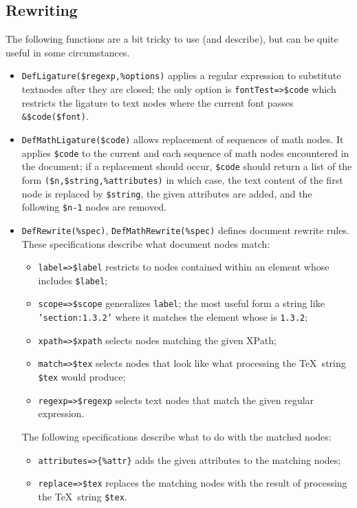 \documentclass{book}
\newcommand{\ltxcode}{\lstinline[style=latexml]}
\begin{document}
\subsection{Rewriting}\label{customization.latexml.rewriting}
The following functions are a bit tricky to use (and describe),
but can be quite useful in some circumstances.
\begin{itemize}
\item \ltxcode|DefLigature($regexp,%
to substitute textnodes after they are closed; the only option is \ltxcode|fontTest=>$code|
which restricts the ligature to text nodes where the current font passes \ltxcode|&$code($font)|.
\item \ltxcode|DefMathLigature($code)| allows replacement of sequences of math nodes.
It applies \ltxcode|$code| to the current 
and each sequence of math nodes encountered in the document; if a replacement should
occur, \ltxcode|$code| should return a list of the form \ltxcode|($n,$string,%
in which case, the text content of the first node is replaced by \ltxcode|$string|,
the given attributes are added, and the following \ltxcode|$n-1| nodes are removed.
\item \ltxcode|DefRewrite(%
rewrite rules. These specifications describe what document nodes match:
\begin{itemize}
\item \ltxcode|label=>$label| restricts to nodes contained within an element whose
   includes \ltxcode|$label|;
\item \ltxcode|scope=>$scope| generalizes \texttt{label}; the most useful form
 a string like \texttt{'section:1.3.2'} where it matches the 
  element whose  is \texttt{1.3.2};
\item \ltxcode|xpath=>$xpath| selects nodes matching the given XPath;
\item \ltxcode|match=>$tex| selects nodes that look like what processing
 the \TeX\ string \ltxcode|$tex| would produce;
\item \ltxcode|regexp=>$regexp| selects text nodes that match the given regular expression.
\end{itemize}
The following specifications describe what to do with the matched nodes:
\begin{itemize}
\item \ltxcode|attributes=>{%
\item \ltxcode|replace=>$tex| replaces the matching nodes with the result
of processing the \TeX\ string \ltxcode|$tex|.
\end{itemize}
\end{itemize}
\end{document}
